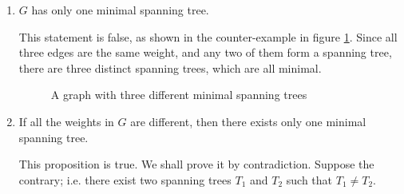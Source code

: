 \documentclass{article}
\begin{document}
\begin{enumerate}
	\item
		\(G\) has only one minimal spanning tree.

		This statement is false, as shown in the counter-example in figure \ref{q4a-counter}. Since all three edges are the same weight, and any two of them form a spanning tree, there are three distinct spanning trees, which are all minimal.
		\begin{figure}[htbp]
			\centering
			\caption{A graph with three different minimal spanning trees}
			\label{q4a-counter}
		\end{figure}

	\item
		If all the weights in \(G\) are different, then there exists only one minimal spanning tree.

		This proposition is true. We shall prove it by contradiction. Suppose the contrary; i.e. there exist two spanning trees \(T_1\) and \(T_2\) such that \(T_1 \neq T_2\).
\end{enumerate}
\end{document}

